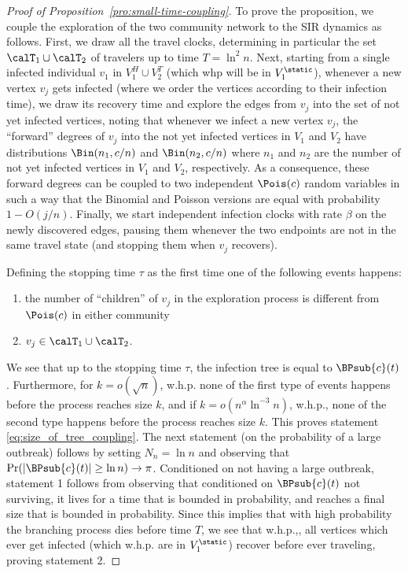 \documentclass[11pt]{article}
\begin{document}
\begin{proof}[Proof of Proposition~\ref{pro:small-time-coupling}]
To prove the proposition, we couple the exploration of the two community network to the SIR dynamics as follows.  First, we draw all the travel clocks, determining in particular the set ${\calT}_1\cup {\calT}_2$ of travelers up to time $T=\ln^2 n$.  Next, 
starting from a single infected individual $v_1$ in $V_1^H\cup V_2^T$ (which whp will be in $V_1^{\static}$), whenever a new vertex $v_j$ gets infected (where we order the vertices according to their infection time), we draw its recovery time and explore  the edges from $v_j$ into the set of not yet infected vertices, noting that
whenever we infect a new vertex $v_j$, the ``forward'' degrees of $v_j$  into the not yet infected vertices in $V_1$ and $V_2$ have distributions $\Bin(n_1,c/n)$ and $\Bin(n_2,c/n)$ where $n_1$ and $n_2$ are the number of not yet infected vertices in $V_1$ and $V_2$, respectively.  As a consequence, these forward degrees can be coupled to two independent $\Pois(c)$ random variables in such a way that the Binomial and Poisson versions are equal with probability
$1-O(j/n)$. Finally, we start independent infection clocks with rate $\beta$ on the newly discovered edges, pausing them whenever the two endpoints are not in the same travel state (and stopping them when $v_j$ recovers).  

Defining the stopping time $\tau$ as the first time one of the following events happens:
\begin{enumerate}
    \item the number of ``children'' of $v_j$ in the exploration process is different from $\Pois(c)$ in either community
    \item $v_j\in{\calT}_1\cup\calT_2$.
\end{enumerate}
We see that up to the stopping time $\tau$, the infection tree is equal to $\BPsub{c}(t)$.
Furthermore, for $k=o(\sqrt n)$, w.h.p. none of the first type of events happens before the process reaches size $k$, and if $k=o(n^{\alpha}\ln^{-3} n)$, w.h.p., none of the second type happens before the process reaches size $k$. This proves statement \ref{eq:size_of_tree_coupling}.  The next statement (on the probability of a large outbreak) follows by setting $N_n=\ln n$ and observing that $\Pr(|\BPsub{c}(t)|\geq \ln n)\to \pi$. Conditioned on not having a large outbreak, statement 1 follows from observing that conditioned on $\BPsub{c}(t)$ not surviving, it lives for a time that is bounded in probability, and reaches a final size that is bounded in probability.
Since this implies that with high probability the branching process dies before time $T$,
we see that w.h.p.,, all vertices which ever get infected (which w.h.p. are in $V_1^{\static}$) recover before ever traveling, proving statement 2.
\end{proof}
\end{document}
